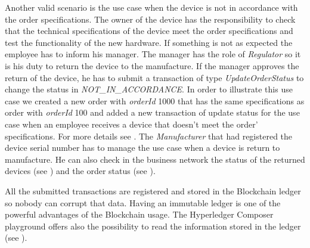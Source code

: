 Another valid scenario is the use case when the device is not in accordance with the order specifications. The owner of the device has the responsibility
to check that the technical specifications of the device meet the order specifications and test the functionality of the new hardware.
If something is not as expected the employee has to inform his manager. The manager has the role of \emph{Regulator} so it is his duty to return the device
to the manufacture. If the manager approves the return of the device, he has to submit a transaction of type \emph{UpdateOrderStatus} to change the status in \emph{NOT_IN_ACCORDANCE}.
In order to illustrate this use case we created a new order with \emph{orderId} 1000 that has the same specifications as order with \emph{orderId} 100 and added a new transaction of update status for the use case when an employee receives a device that doesn't meet the order' specifications. For more details see .
The \emph{Manufacturer} that had registered the device serial number has to manage the use case when a device is return to manufacture. He can also check in the business network the status of the returned devices (see ) and the order status (see ). 
 






All the submitted transactions are registered and stored in the Blockchain ledger so nobody can corrupt that data. Having an immutable ledger is one of the powerful advantages of the Blockchain usage. The Hyperledger Composer playground offers also the possibility to read the information stored in the ledger (see ).
\\

